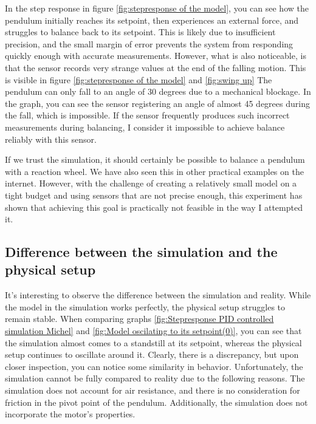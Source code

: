 \documentclass{article}
\begin{document}
\begin{multicols}{2}


In the step response in figure \ref{fig:stepresponse of the model}, you can see how the pendulum initially reaches its setpoint, then experiences an external force, and struggles to balance back to its setpoint. This is likely due to insufficient precision, and the small margin of error prevents the system from responding quickly enough with accurate measurements. However, what is also noticeable, is that the sensor records very strange values at the end of the falling motion. This is visible in figure \ref{fig:stepresponse of the model} and \ref{fig:swing up} The pendulum can only fall to an angle of 30 degrees due to a mechanical blockage. In the graph, you can see the sensor registering an angle of almost 45 degrees during the fall, which is impossible. If the sensor frequently produces such incorrect measurements during balancing, I consider it impossible to achieve balance reliably with this sensor.

\vspace{.5cm}

If we trust the simulation, it should certainly be possible to balance a pendulum with a reaction wheel. We have also seen this in other practical examples on the internet. However, with the challenge of creating a relatively small model on a tight budget and using sensors that are not precise enough, this experiment has shown that achieving this goal is practically not feasible in the way I attempted it.

\subsection{Difference between the simulation and the physical setup}

It's interesting to observe the difference between the simulation and reality. While the model in the simulation works perfectly, the physical setup struggles to remain stable. When comparing graphs \ref{fig:Stepresponse PID controlled simulation Michel} and \ref{fig:Model oscilating to its setpoint(0)}, you can see that the simulation almost comes to a standstill at its setpoint, whereas the physical setup continues to oscillate around it. Clearly, there is a discrepancy, but upon closer inspection, you can notice some similarity in behavior. Unfortunately, the simulation cannot be fully compared to reality due to the following reasons. The simulation does not account for air resistance, and there is no consideration for friction in the pivot point of the pendulum. Additionally, the simulation does not incorporate the motor's properties.


\end{multicols}
\end{document}
